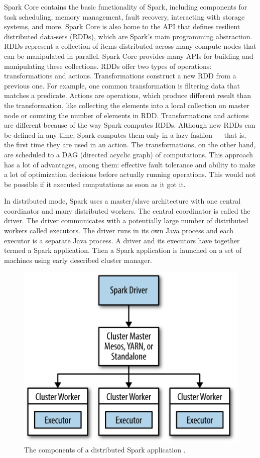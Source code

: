 Spark Core contains the basic functionality of Spark, including components for task scheduling, memory management, fault recovery, interacting with storage systems, and more. Spark Core is also home to the API that defines resilient distributed data‐sets (RDDs), which are Spark’s main programming abstraction. RDDs represent a collection of items distributed across many compute nodes that can be manipulated in parallel. Spark Core provides many APIs for building and manipulating these collections. RDDs offer two types of operations: transformations and actions. Transformations construct a new RDD from a previous one. For example, one common transformation is filtering data that matches a predicate. Actions are operations, which produce different result than the transformation, like collecting the elements into a local collection on master node or counting the number of elements in RDD. Transformations and actions are different because of the way Spark computes RDDs. Although new RDDs can be defined in any time, Spark computes them only in a lazy fashion — that is, the first time they are used in an action. The transformations, on the other hand, are scheduled to a DAG (directed acyclic graph) of computations. This approach has a lot of advantages, among them: effective fault tolerance and ability to make a lot of optimization decisions before actually running operations. This would not be possible if it executed computations as soon as it got it.

In distributed mode, Spark uses a master/slave architecture with one central coordinator and many distributed workers. The central coordinator is called the driver. The driver communicates with a potentially large number of distributed workers called executors. The driver runs in its own Java process and each executor is a separate Java process. A driver and its executors have together termed a Spark application. Then a Spark application is launched on a set of machines using early described cluster manager.

\begin{figure}
\centering\includegraphics[width=.6\textwidth]{img/spark-runtime-split}
\caption{ The components of a distributed Spark application \cite{learning_spark}.}  \label{img:spark-components}
\end{figure}

